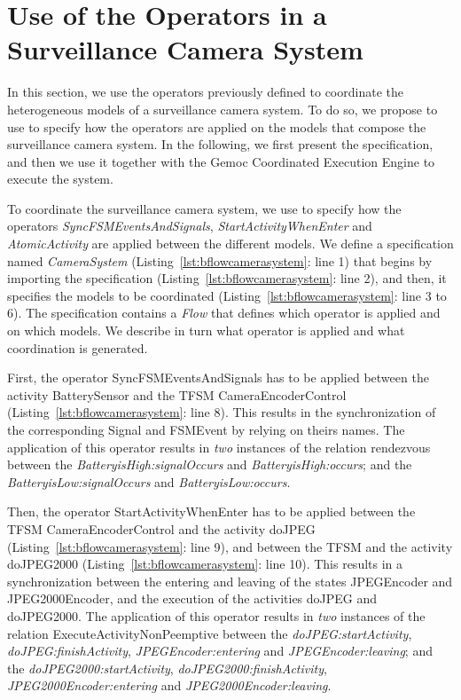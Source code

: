 \section{Use of the Operators in a Surveillance Camera System}
In this section, we use the operators previously defined to coordinate the heterogeneous models of a surveillance camera system. To do so, we propose to use \bflow to specify how the operators are applied on the models that compose the surveillance camera system. In the following, we first present the \bflow specification, and then we use it together with the Gemoc Coordinated Execution Engine to execute the system. 

To coordinate the surveillance camera system, we use \bflow to specify how the operators \emph{SyncFSMEventsAndSignals}, \emph{StartActivityWhenEnter} and \emph{AtomicActivity} are applied between the different models. We define a \bflow specification named \emph{CameraSystem} (Listing~\ref{lst:bflowcamerasystem}: line 1) that begins by importing the \bcool specification (Listing~\ref{lst:bflowcamerasystem}: line 2), and then, it specifies the models to be coordinated (Listing~\ref{lst:bflowcamerasystem}: line 3 to 6). The specification contains a \emph{Flow} that defines which operator is applied and on which models. We describe in turn what operator is applied and what coordination is generated.

First, the operator SyncFSMEventsAndSignals has to be applied between the activity BatterySensor and the TFSM CameraEncoderControl (Listing~\ref{lst:bflowcamerasystem}: line 8). This results in the synchronization of the corresponding Signal and FSMEvent by relying on theirs names. The application of this operator results in \emph{two} instances of the \ccsl relation rendezvous between the \mse \emph{BatteryisHigh:signalOccurs} and \emph{BatteryisHigh:occurs}; and the \mse \emph{BatteryisLow:signalOccurs} and \emph{BatteryisLow:occurs}. 

Then, the operator StartActivityWhenEnter has to be applied between the TFSM CameraEncoderControl and the activity doJPEG (Listing~\ref{lst:bflowcamerasystem}: line 9), and between the TFSM and the activity doJPEG2000 (Listing~\ref{lst:bflowcamerasystem}: line 10). This results in a synchronization between the entering and leaving of the states JPEGEncoder and JPEG2000Encoder, and the execution of the activities doJPEG and doJPEG2000. The application of this operator results in \emph{two} instances of the \moccml relation ExecuteActivityNonPeemptive between the \mse \emph{doJPEG:startActivity}, \emph{doJPEG:finishActivity}, \emph{JPEGEncoder:entering} and \emph{JPEGEncoder:leaving}; and the \mse \emph{doJPEG2000:startActivity}, \emph{doJPEG2000:finishActivity}, \emph{JPEG2000Encoder:entering} and \emph{JPEG2000Encoder:leaving}.   

